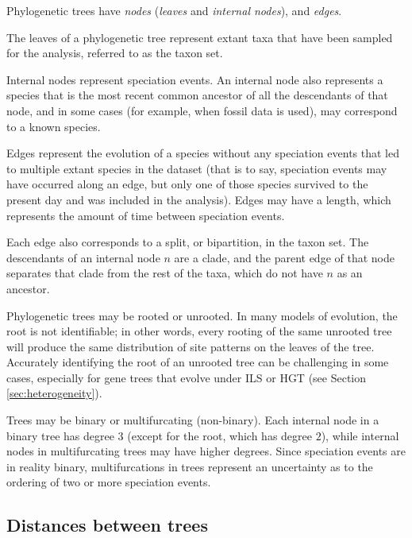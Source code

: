 \documentclass[edeposit,fullpage]{uiucthesis2014}
\theoremstyle{definition}
\begin{document}
Phylogenetic trees have \emph{nodes} (\emph{leaves} and \emph{internal
  nodes}), and \emph{edges}.

The leaves of a phylogenetic tree represent extant taxa that have been
sampled for the analysis, referred to as the taxon set.

Internal nodes represent speciation events. An internal node also
represents a species that is the most recent common ancestor of all
the descendants of that node, and in some cases (for example, when
fossil data is used), may correspond to a known species.

Edges represent the evolution of a species without any speciation
events that led to multiple extant species in the dataset (that is to
say, speciation events may have occurred along an edge, but only one
of those species survived to the present day and was included in the
analysis). Edges may have a length, which represents the amount of
time between speciation events.


Each edge also corresponds to a split, or bipartition, in the taxon
set. The descendants of an internal node $n$ are a clade, and the
parent edge of that node separates that clade from the rest of the
taxa, which do not have $n$ as an ancestor.



Phylogenetic trees may be rooted or unrooted. In many models of
evolution, the root is not identifiable; in other words, every rooting
of the same unrooted tree will produce the same distribution of site
patterns on the leaves of the tree. Accurately identifying the root of
an unrooted tree can be challenging in some cases, especially for gene
trees that evolve under ILS or HGT (see Section
\ref{sec:heterogeneity}).

Trees may be binary or multifurcating (non-binary). Each internal node
in a binary tree has degree $3$ (except for the root, which has degree
$2$), while internal nodes in multifurcating trees may have higher
degrees. Since speciation events are in reality binary,
multifurcations in trees represent an uncertainty as to the ordering
of two or more speciation events.

\subsection{Distances between trees}
\end{document}
